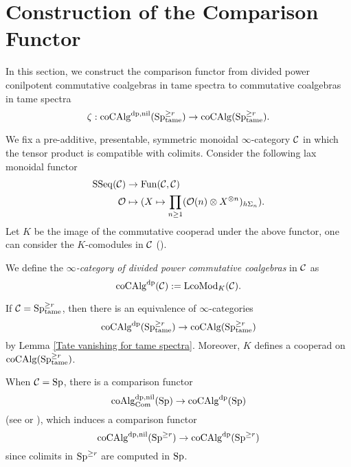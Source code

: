 \section{Construction of the Comparison Functor}
\label{Construction of the Comparison Functor}
In this section, we construct the comparison functor from divided power conilpotent commutative coalgebras in tame spectra to commutative coalgebras in tame spectra
$$
\zeta:\operatorname{coCAlg}^{\operatorname{dp},\operatorname{nil}}(\operatorname{Sp}^{\geq r}_{\operatorname{\operatorname{tame}}}) \to
\operatorname{coCAlg}(\operatorname{Sp}^{\geq r}_{\operatorname{\operatorname{tame}}}).
$$

We fix a pre-additive, presentable, symmetric monoidal $\infty$-category ${\mathcal{C}}$ in which the tensor product is compatible with colimits. 
Consider the following lax monoidal functor 
\begin{align*}
    \operatorname{SSeq}({\mathcal{C}}) & \to \operatorname{Fun}({\mathcal{C}}, {\mathcal{C}})\\
    {\mathcal{O}} &\mapsto (X \mapsto \prod_{n\geq 1} ({\mathcal{O}}(n) \otimes X^{\otimes n})_{h\Sigma_n}).
\end{align*}
Let $K$ be the image of the commutative cooperad under the above functor, one can consider the $K$-comodules in ${\mathcal{C}}$ (\cite[\S 3.5]{Francis-Gaitsgory}).
\begin{definition}
    We define the \emph{$\infty$-category of divided power commutative coalgebras} in ${\mathcal{C}}$ as 
$$
\operatorname{coCAlg}^{\operatorname{dp}}({\mathcal{C}}):= \operatorname{LcoMod}_{K}({\mathcal{C}}).
$$
\end{definition}
\begin{remark}
\label{Remark A4.2}
If ${\mathcal{C}}=\operatorname{Sp}^{\geq r}_{\operatorname{\operatorname{tame}}}$, then there is an equivalence of $\infty$-categories 
$$
\operatorname{coCAlg}^{\operatorname{dp}}(\operatorname{Sp}^{\geq r}_{\operatorname{\operatorname{tame}}})
\to 
\operatorname{coCAlg}(\operatorname{Sp}^{\geq r}_{\operatorname{\operatorname{tame}}})
$$
by Lemma \ref{Tate vanishing for tame spectra}. Moreover, $K$ defines a cooperad on $\operatorname{coCAlg}(\operatorname{Sp}^{\geq r}_{\operatorname{\operatorname{tame}}})$.
\end{remark}

\begin{remark}
\label{Remark A4.3}
When ${\mathcal{C}}=\operatorname{Sp}$, there is a comparison functor
$$
\operatorname{coAlg}^{\operatorname{dp}, \operatorname{nil}}_{\operatorname{Com}}(\operatorname{Sp}) \to  \operatorname{coCAlg}^{\operatorname{dp}}(\operatorname{Sp})
$$
(see \cite[Section 3.5]{Francis-Gaitsgory} or \cite{Heuts_Koszul}), which induces a comparison functor
\begin{equation}
\label{comparison functor for r-conn Sp}
    \operatorname{coCAlg}^{\operatorname{dp}, \operatorname{nil}}(\operatorname{Sp}^{\geq r}) \to  \operatorname{coCAlg}^{\operatorname{dp}}(\operatorname{Sp}^{\geq r})
\end{equation}
since colimits in $\operatorname{Sp}^{\geq r}$ are computed in $\operatorname{Sp}$.
\end{remark}

